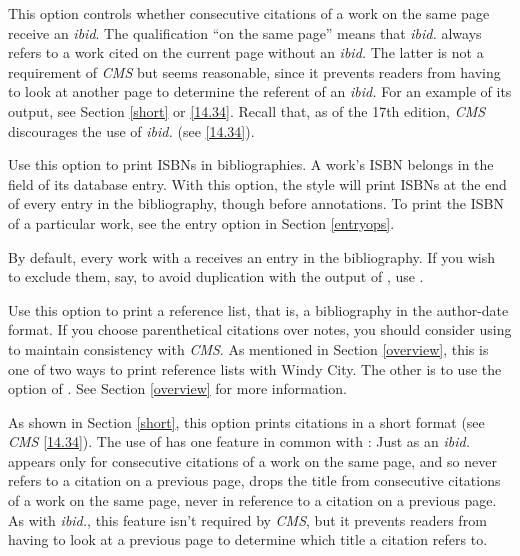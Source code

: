 \documentclass[11pt,letterpaper,oneside]{article}
\begin{document}
\begin{optionlist}

\noindent This option controls whether consecutive citations of a work
on the same page receive an \textit{ibid}. The qualification ``on the
same page'' means that \textit{ibid.} always refers to a work cited on
the current page without an \textit{ibid.} The latter is not a
requirement of \textit{CMS} but seems reasonable, since it prevents
readers from having to look at another page to determine the referent
of an \textit{ibid.} For an example of its output, see Section
\ref{short} or \ref{14.34}. Recall that, as of the 17th edition,
\textit{CMS} discourages the use of \textit{ibid.} (see \ref{14.34}).


\noindent Use this option to print ISBNs in bibliographies. A work's
ISBN belongs in the  field of its database entry. With
this option, the style will print ISBNs at the end of every entry in
the bibliography, though before annotations. To print the ISBN of a
particular work, see the  entry option in Section
\ref{entryops}.


\noindent By default, every work with a  receives
an entry in the bibliography. If you wish to exclude them, say, to
avoid duplication with the output of , use
.


\noindent Use this option to print a reference list, that is, a
bibliography in the author-date format. If you choose parenthetical
citations over notes, you should consider using  to
maintain consistency with \textit{CMS}. As mentioned in Section
\ref{overview}, this is one of two ways to print reference lists with
Windy City. The other is to use the  option of
. See Section \ref{overview} for more
information.


\noindent As shown in Section \ref{short}, this option prints
citations in a short format (see \textit{CMS} \ref{14.34}). The use of
 has one feature in common with : Just as an
\textit{ibid.} appears only for consecutive citations of a work on the
same page, and so never refers to a citation on a previous page,
 drops the title from consecutive citations of a work on
the same page, never in reference to a citation on a previous page. As
with \textit{ibid.}, this feature isn't required by \textit{CMS}, but
it prevents readers from having to look at a previous page to
determine which title a citation refers to.


\end{optionlist}
\end{document}
